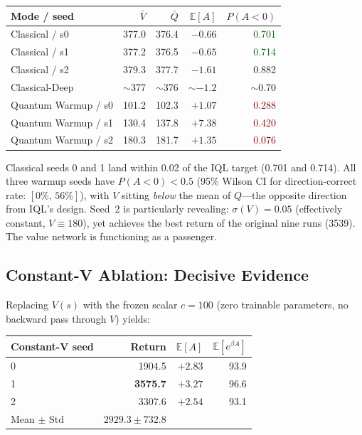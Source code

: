 \documentclass[10pt,a4paper]{article}
\begin{document}
\begin{center}
\setlength{\tabcolsep}{8pt}
\begin{tabular}{lrrrr}
\toprule
Mode / seed & $\bar V$ & $\bar Q$ & $\mathbb{E}[A]$ & $P(A{<}0)$ \\
\midrule
Classical / s0    & 377.0 & 376.4 & $-0.66$ & \textcolor{darkgreen}{0.701} \\
Classical / s1    & 377.2 & 376.5 & $-0.65$ & \textcolor{darkgreen}{0.714} \\
Classical / s2    & 379.3 & 377.7 & $-1.61$ & 0.882 \\
Classical-Deep    & $\sim$377 & $\sim$376 & $\sim{-1.2}$ & $\sim$0.70 \\
\midrule
Quantum Warmup / s0 & 101.2 & 102.3 & $+1.07$ & \textcolor{darkred}{0.288} \\
Quantum Warmup / s1 & 130.4 & 137.8 & $+7.38$ & \textcolor{darkred}{0.420} \\
Quantum Warmup / s2 & 180.3 & 181.7 & $+1.35$ & \textcolor{darkred}{0.076} \\
\bottomrule
\end{tabular}
\end{center}

Classical seeds 0 and 1 land within 0.02 of the IQL target (0.701 and
0.714).
All three warmup seeds have $P(A<0)<0.5$ (95\% Wilson CI for direction-correct
rate: $[0\%,\,56\%]$), with $V$ sitting \emph{below} the mean of $Q$---the
opposite direction from IQL's design.
Seed~2 is particularly revealing: $\sigma(V)=0.05$ (effectively constant,
$V\equiv180$), yet achieves the best return of the original nine runs (3539).
The value network is functioning as a passenger.

\subsection{Constant-V Ablation: Decisive Evidence}
\label{sec:constv}

Replacing $V(s)$ with the frozen scalar $c=100$ (zero trainable parameters,
no backward pass through $V$) yields:

\begin{center}
\setlength{\tabcolsep}{8pt}
\begin{tabular}{lrrr}
\toprule
Constant-V seed & Return & $\mathbb{E}[A]$ & $\mathbb{E}[e^{\beta A}]$ \\
\midrule
0 & 1904.5 & $+2.83$ & 93.9 \\
1 & \textbf{3575.7} & $+3.27$ & 96.6 \\
2 & 3307.6 & $+2.54$ & 93.1 \\
\midrule
Mean $\pm$ Std & $2929.3 \pm 732.8$ & & \\
\bottomrule
\end{tabular}
\end{center}
\end{document}
